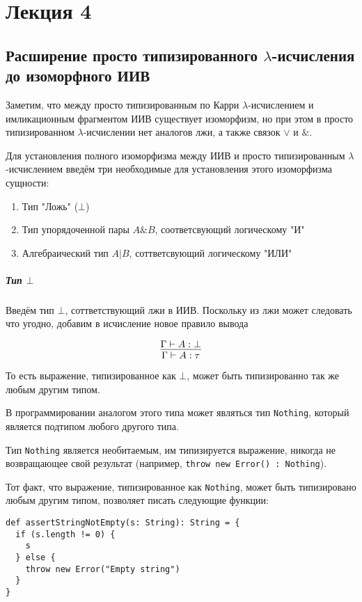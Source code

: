\section{Лекция 4}

\subsection{Расширение просто типизированного $\lambda$-исчисления до изоморфного ИИВ}

Заметим, что между просто типизированным по Карри $\lambda$-исчислением и имликационным фрагментом ИИВ существует изоморфизм, но при этом в просто типизированном $\lambda$-исчислении нет аналогов лжи, а также связок $\vee$ и $\&$.

Для установления полного изоморфизма между ИИВ и просто типизированным $\lambda$-исчислением введём три необходимые для установления этого изоморфизма сущности:

\begin{enumerate}
	\item Тип "Ложь" ($\bot$)
	
	\item Тип упорядоченной пары $A\&B$, соответсвующий	логическому "И"
	
	\item Алгебраический тип $A | B$, соттветсвующий логическому "ИЛИ"
\end{enumerate}

\subparagraph{Тип $\bot$}

Введём тип $\bot$, соттветствующий лжи в ИИВ. Поскольку из лжи может следовать что угодно, добавим в исчисление новое правило вывода

\[
\infer{\Gamma \vdash A : \tau}{\Gamma \vdash A: \bot}
\]

То есть выражение, типизированное как $\bot$, может быть типизированно так же любым другим типом.

В программировании аналогом этого типа может являться тип \texttt{Nothing}, который является подтипом любого другого типа.

Тип \texttt{Nothing} является необитаемым, им типизируется выражение, никогда не возвращающее свой результат (например, \texttt{throw new Error() : Nothing}). 

Тот факт, что выражение, типизированное как \texttt{Nothing}, может быть типизировано любым другим типом, позволяет писать следующие функции:

\begin{verbatim}
def assertStringNotEmpty(s: String): String = {
  if (s.length != 0) {
    s
  } else {
    throw new Error("Empty string")
  }
}
\end{verbatim}

